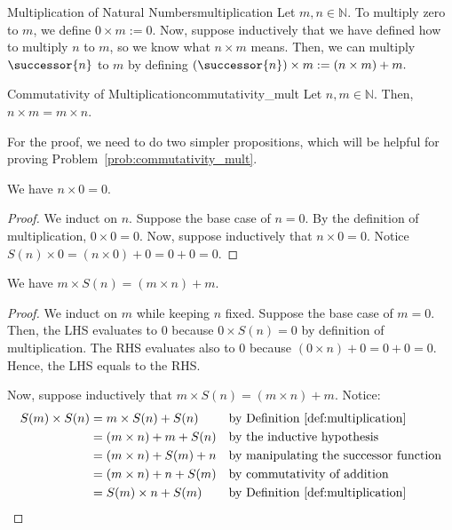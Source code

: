 \begin{definition}{Multiplication of Natural Numbers}{multiplication}
    Let $m, n \in \mathbb{N}.$
    To multiply zero to $m$, we define $0 \times m := 0.$
    Now, suppose inductively that we have defined how to multiply $n$ to $m$, so we know what $n \times m$ means.
    Then, we can multiply $\successor{n}$ to $m$ by defining $(\successor{n}) \times m := (n \times m) + m.$
\end{definition}
\begin{problem_labelled}{Commutativity of Multiplication}{commutativity_mult}
    Let $n, m \in \mathbb{N}.$ 
    Then, $n \times m = m \times n.$ 
\end{problem_labelled}
For the proof, we need to do two simpler propositions, which will be helpful for proving Problem~\ref{prob:commutativity_mult}.
\begin{proposition}
    We have $n \times 0 = 0.$
\end{proposition}
\begin{proof}
    We induct on $n$. 
    Suppose the base case of $n = 0.$ 
    By the definition of multiplication, $0 \times 0 = 0.$
    Now, suppose inductively that $n \times 0 = 0.$
    Notice $S(n) \times 0 = (n \times 0) + 0 = 0 + 0 = 0.$
\end{proof}

\begin{proposition}
    We have $m \times S(n) = (m \times n) + m.$
\end{proposition}
\begin{proof}
    We induct on $m$ while keeping $n$ fixed.
    Suppose the base case of $m = 0.$
    Then, the LHS evaluates to 0 because $0 \times S(n) = 0$ by definition of multiplication.
    The RHS evaluates also to 0 because $(0 \times n) + 0 = 0 + 0 = 0.$ 
    Hence, the LHS equals to the RHS.

    Now, suppose inductively that $m \times S(n)= (m \times n) + m.$
    Notice:
    \begin{align*}
        S(m) \times S(n) &= m \times S(n) + S(n) &&\text{by Definition~\ref{def:multiplication}} \\
        &= (m \times n ) + m + S(n) &&\text{by the inductive hypothesis} \\
        &= (m \times n) + S(m) + n &&\text{by manipulating the successor function} \\
        &= (m \times n) + n + S(m)  &&\text{by commutativity of addition} \\
        &= S(m) \times n + S(m) &&\text{by Definition~\ref{def:multiplication}}
    \end{align*} 
\end{proof}

